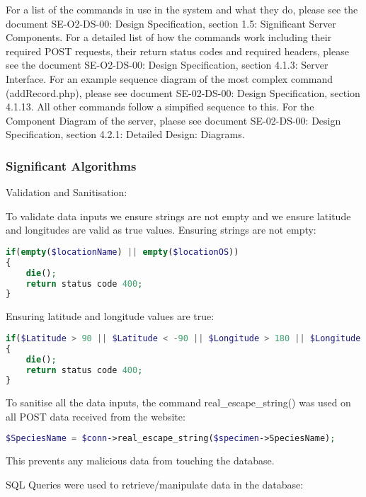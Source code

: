         For a list of the commands in use in the system and what they do, please see the document SE-O2-DS-00: Design Specification, section 1.5: Significant Server Components. For a detailed list of how the commands work including their required POST requests, their return status codes and required headers, please see the document SE-O2-DS-00: Design Specification, section 4.1.3: Server Interface. For an example sequence diagram of the most complex command (addRecord.php), please see document SE-02-DS-00: Design Specification, section 4.1.13. All other commands follow a simpified sequence to this. For the Component Diagram of the server, plaese see document SE-02-DS-00: Design Specification, section 4.2.1: Detailed Design: Diagrams. 

    \subsubsection{Significant Algorithms}

        Validation and Sanitisation:

        To validate data inputs we ensure strings are not empty and we ensure latitude and longitudes are valid as true values. Ensuring strings are not empty: 
        
        \begin{lstlisting}[language=php]
if(empty($locationName) || empty($locationOS))
{
    die();
    return status code 400;
}
        \end{lstlisting}

        Ensuring latitude and longitude values are true:
    
        \begin{lstlisting}[language=php]
if($Latitude > 90 || $Latitude < -90 || $Longitude > 180 || $Longitude < -180)
{
    die();
    return status code 400;
}
        \end{lstlisting}

        To sanitise all the data inputs, the command real\_escape\_string() was used on all POST data received from the website: 
        
        \begin{lstlisting}[language=php]
$SpeciesName = $conn->real_escape_string($specimen->SpeciesName);
        \end{lstlisting}
        
        This prevents any malicious data from touching the database.

        SQL Queries were used to retrieve/manipulate data in the database:

